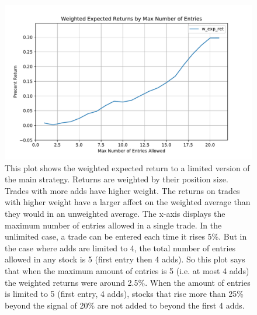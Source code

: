 \documentclass{article}
\begin{document}
	\begin{figure}
	\includegraphics[width=\textwidth]{prog_entry_w_avg.pdf}
	\caption{This plot shows the weighted expected return to a limited version of the main strategy. Returns are weighted by their position size. Trades with more adds have higher weight. The returns on trades with higher weight have a larger affect on the weighted average than they would in an unweighted average. The x-axis displays the maximum number of entries allowed in a single trade. In the unlimited case, a trade can be entered each time it rises 5\%. But in the case where adds are limited to 4, the total number of entries allowed in any stock is 5 (first entry then 4 adds). So this plot says that when the maximum amount of entries is 5 (i.e. at most 4 adds) the weighted returns were around 2.5\%. When the amount of entries is limited to 5 (first entry, 4 adds), stocks that rise more than 25\% beyond the signal of 20\% are not added to beyond the first 4 adds.}
	\label{w_avg_strat}
	\end{figure}
	
\end{document}
